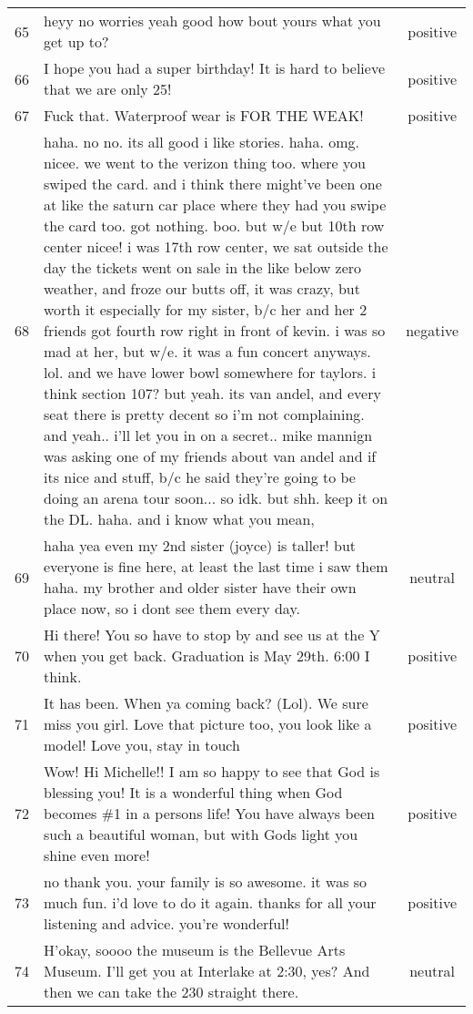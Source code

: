 \begin{center}
\begin{footnotesize}
\begin{longtable}{cp{3.8in}c}
65 & heyy no worries yeah good how bout yours what you get up to?  & positive\\
66 & I hope you had a super birthday!  It is hard to believe that we are only 25! & positive\\
67 & Fuck that. Waterproof wear is FOR THE WEAK!  & positive\\
68 & haha. no no. its all good i like stories. haha. omg. nicee. we went to the verizon thing too. where you swiped the card. and i think there might've been one at like the saturn car place where they had you swipe the card too. got nothing. boo. but w/e but 10th row center nicee! i was 17th row center, we sat outside the day the tickets went on sale in the like below zero weather, and froze our butts off, it was crazy, but worth it especially for my sister, b/c her and her 2 friends got fourth row right in front of kevin. i was so mad at her, but w/e. it was a fun concert anyways. lol. and we have lower bowl somewhere for taylors. i think section 107? but yeah. its van andel, and every seat there is pretty decent so i'm not complaining. and yeah.. i'll let you in on a secret.. mike mannign was asking one of my friends about van andel and if its nice and stuff, b/c he said they're going to be doing an arena tour soon... so idk. but shh. keep it on the DL. haha. and i know what you mean, & negative\\
69 & haha yea even my 2nd sister (joyce) is taller! but everyone is fine here, at least the last time i saw them haha. my brother and older sister have their own place now, so i dont see them every day. & neutral\\
70 & Hi there! You so have to stop by and see us at the Y when you get back. Graduation is May 29th. 6:00 I think. & positive\\
71 & It has been. When ya coming back? (Lol). We sure miss you girl.  Love that picture too, you look like a model!  Love you, stay in touch & positive\\
72 & Wow!  Hi Michelle!!  I am so happy to see that God is blessing you!  It is a wonderful thing when God becomes \#1 in a persons life!  You have always been such a beautiful woman, but with Gods light you shine even more!   & positive\\
73 & no thank you.  your family is so awesome.  it was so much fun. i'd love to do it again.  thanks for all your listening and advice.  you're wonderful! & positive\\
74 & H'okay, soooo the museum is the Bellevue Arts Museum. I'll get you at Interlake at 2:30, yes? And then we can take the 230 straight there. & neutral\\

\end{longtable}
\end{footnotesize}
\end{center}
